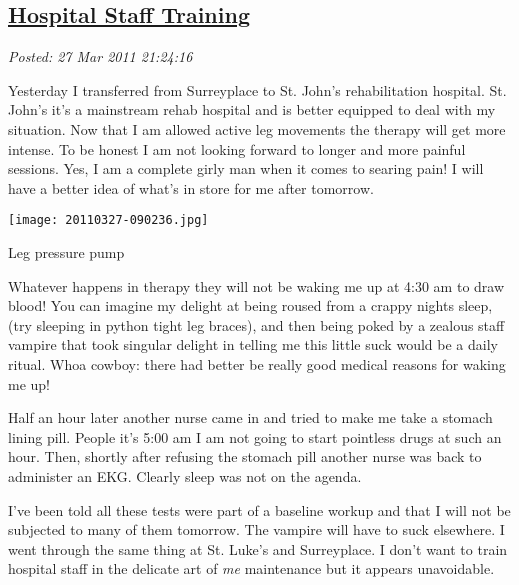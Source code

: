 %

\subsection*{\href{http://bakerjd99.wordpress.com/2011/03/27/hospital-staff-training/}{Hospital Staff Training}}


\noindent\emph{Posted: 27 Mar 2011 21:24:16}
\vspace{6pt}

Yesterday I transferred from Surreyplace to St. John's rehabilitation
hospital. St. John's it's a mainstream rehab hospital and is better
equipped to deal with my situation. Now that I am allowed active leg
movements the therapy will get more intense. To be honest I am not
looking forward to longer and more painful sessions. Yes, I am a
complete girly man when it comes to searing pain! I will have a better
idea of what's in store for me after tomorrow.

\captionsetup[floatingfigure]{labelformat=empty}
\begin{floatingfigure}[r]{0.25\textwidth}
\centering
\texttt{[image: 20110327-090236.jpg]}
\caption{Leg pressure pump}
\label{fig:1241X0}
\end{floatingfigure}Whatever happens in therapy they will not be waking me up at 4:30 am to
draw blood! You can imagine my delight at being roused from a crappy
nights sleep, (try sleeping in python tight leg braces), and then being
poked by a zealous staff vampire that took singular delight in telling
me this little suck would be a daily ritual. Whoa cowboy: there had
better be really good medical reasons for waking me up!

Half an hour later another nurse came in and tried to make me take a
stomach lining pill. People it's 5:00 am I am not going to start
pointless drugs at such an hour. Then, shortly after refusing the
stomach pill another nurse was back to administer an EKG. Clearly sleep
was not on the agenda.

I've been told all these tests were part of a baseline workup and that I
will not be subjected to many of them tomorrow. The vampire will have to
suck elsewhere.
I went through the same thing at St. Luke's and Surreyplace. I don't
want to train hospital staff in the delicate art of \emph{me} maintenance but
it appears unavoidable.





%
